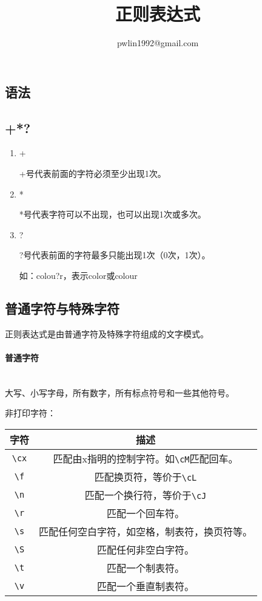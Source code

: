 \documentclass{article}
\title{正则表达式}
\author{pwlin1992@gmail.com}
\begin{document}
\maketitle
\tableofcontents
\begin{large}
  \section{语法}
  \subsection{+*?}
  \begin{enumerate}
  \item +

    +号代表前面的字符必须至少出现1次。
  \item *

    *号代表字符可以不出现，也可以出现1次或多次。
  \item ?

    ?号代表前面的字符最多只能出现1次（0次，1次）。

    如：colou?r，表示color或colour
  \end{enumerate}

  \subsection{普通字符与特殊字符}
  正则表达式是由普通字符及特殊字符组成的文字模式。

  \paragraph{普通字符}\mbox{} \\

  大写、小写字母，所有数字，所有标点符号和一些其他符号。

  非打印字符：

  \begin{tabular}{|c|c|}
    \hline
    字符 & 描述 \\
    \hline
    \verb|\cx| & 匹配由x指明的控制字符。如\verb|\cM|匹配回车。\\
    \hline
    \verb|\f| & 匹配换页符，等价于\verb|\cL| \\
    \hline
    \verb|\n| & 匹配一个换行符，等价于\verb|\cJ| \\
    \hline
    \verb|\r| & 匹配一个回车符。 \\
    \hline
    \verb|\s| & 匹配任何空白字符，如空格，制表符，换页符等。 \\
    \hline
    \verb|\S| & 匹配任何非空白字符。 \\
    \hline
    \verb|\t| & 匹配一个制表符。 \\
    \hline
    \verb|\v| & 匹配一个垂直制表符。\\
    \hline
  \end{tabular}


\end{large}
\end{document}
